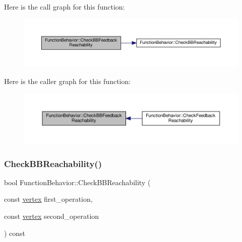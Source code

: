 Here is the call graph for this function\+:
\nopagebreak
\begin{figure}[H]
\begin{center}
\leavevmode
\includegraphics[width=350pt]{d9/d45/classFunctionBehavior_af24a99568892a6b7d7659302e4f7b03f_cgraph}
\end{center}
\end{figure}
Here is the caller graph for this function\+:
\nopagebreak
\begin{figure}[H]
\begin{center}
\leavevmode
\includegraphics[width=350pt]{d9/d45/classFunctionBehavior_af24a99568892a6b7d7659302e4f7b03f_icgraph}
\end{center}
\end{figure}
\mbox{\label{classFunctionBehavior_aa2a720e2f8f4f6d7d3240bbc13f758e9}} 
\subsubsection{\texorpdfstring{Check\+B\+B\+Reachability()}{CheckBBReachability()}}
{\footnotesize\ttfamily bool Function\+Behavior\+::\+Check\+B\+B\+Reachability (\begin{DoxyParamCaption}\item[{const \hyperlink{graph_8hpp_abefdcf0544e601805af44eca032cca14}{vertex}}]{first\+\_\+operation,  }\item[{const \hyperlink{graph_8hpp_abefdcf0544e601805af44eca032cca14}{vertex}}]{second\+\_\+operation }\end{DoxyParamCaption}) const}




